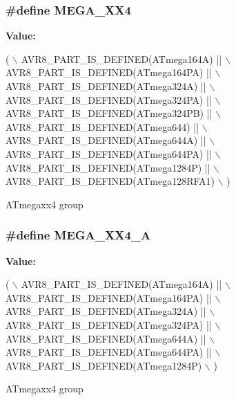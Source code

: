 \subsubsection[{M\+E\+G\+A\+\_\+\+X\+X4}]{\setlength{\rightskip}{0pt plus 5cm}\#define M\+E\+G\+A\+\_\+\+X\+X4}\label{group__mega__part__macros__group_gadcf5297df4d3d2f2bb5ccd7d6e3578b6}
{\bfseries Value\+:}
\begin{DoxyCode}
( \(\backslash\)
        AVR8\_PART\_IS\_DEFINED(ATmega164A)  || \(\backslash\)
        AVR8\_PART\_IS\_DEFINED(ATmega164PA) || \(\backslash\)
        AVR8\_PART\_IS\_DEFINED(ATmega324A)  || \(\backslash\)
        AVR8\_PART\_IS\_DEFINED(ATmega324PA) || \(\backslash\)
        AVR8\_PART\_IS\_DEFINED(ATmega324PB) || \(\backslash\)
        AVR8\_PART\_IS\_DEFINED(ATmega644)   || \(\backslash\)
        AVR8\_PART\_IS\_DEFINED(ATmega644A)  || \(\backslash\)
        AVR8\_PART\_IS\_DEFINED(ATmega644PA) || \(\backslash\)
        AVR8\_PART\_IS\_DEFINED(ATmega1284P)   || \(\backslash\)
        AVR8\_PART\_IS\_DEFINED(ATmega128RFA1) \(\backslash\)
        )
\end{DoxyCode}
A\+Tmegaxx4 group \hypertarget{group__mega__part__macros__group_gaf7dde20cbd5a8e5d53438e8dfac074a2}{}
\subsubsection[{M\+E\+G\+A\+\_\+\+X\+X4\+\_\+\+A}]{\setlength{\rightskip}{0pt plus 5cm}\#define M\+E\+G\+A\+\_\+\+X\+X4\+\_\+\+A}\label{group__mega__part__macros__group_gaf7dde20cbd5a8e5d53438e8dfac074a2}
{\bfseries Value\+:}
\begin{DoxyCode}
( \(\backslash\)
        AVR8\_PART\_IS\_DEFINED(ATmega164A)  || \(\backslash\)
        AVR8\_PART\_IS\_DEFINED(ATmega164PA) || \(\backslash\)
        AVR8\_PART\_IS\_DEFINED(ATmega324A)  || \(\backslash\)
        AVR8\_PART\_IS\_DEFINED(ATmega324PA) || \(\backslash\)
        AVR8\_PART\_IS\_DEFINED(ATmega644A)  || \(\backslash\)
        AVR8\_PART\_IS\_DEFINED(ATmega644PA) || \(\backslash\)
        AVR8\_PART\_IS\_DEFINED(ATmega1284P) \(\backslash\)
        )
\end{DoxyCode}
A\+Tmegaxx4 group \hypertarget{group__mega__part__macros__group_ga47583caa82990781cd23a8495710ef31}{}
